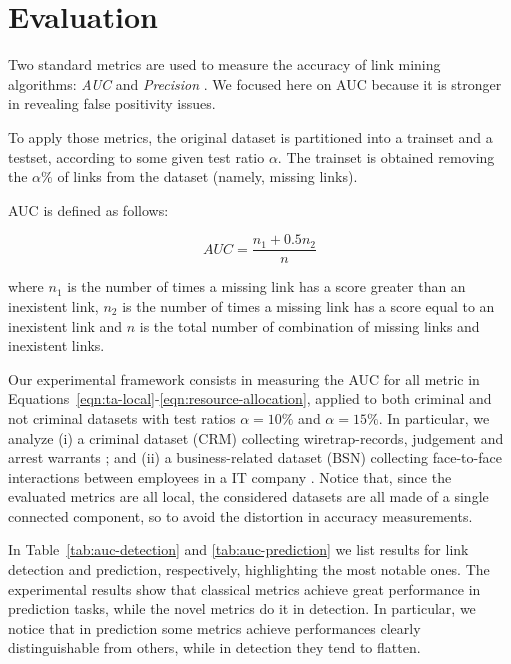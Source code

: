 \section{Evaluation}
\label{sec:evaluation}

Two standard metrics are used to measure the accuracy of link mining algorithms: \textit{AUC} and  \textit{Precision} \cite{Lu2011}. We focused here on AUC because it is stronger in revealing false positivity issues.

To apply those metrics, the original dataset is partitioned into a trainset and a testset, according to some given test ratio $\alpha$. The trainset is obtained removing the $\alpha\%$ of links from the dataset (namely, missing links).

AUC is defined as follows:

\begin{equation}
\label{eqn:auc}
AUC=\frac{n_{1}+0.5n_{2}}{n}
\end{equation}

where 
$n_{1}$ is the number of times a missing link has a score greater than an inexistent link,
$n_{2}$ is the number of times a missing link has a score equal to an inexistent link and
$n$ is the total number of combination of missing links and inexistent links.

Our experimental framework consists in measuring the AUC for all metric in Equations~\ref{eqn:ta-local}-\ref{eqn:resource-allocation}, applied to both criminal and not criminal datasets with test ratios $\alpha=10\%$ and $\alpha=15\%$.
In particular, we analyze 
(i) a criminal dataset (CRM) collecting wiretrap-records, judgement and arrest warrants \cite{berlusconi2016link}; and
(ii) a business-related dataset (BSN) collecting face-to-face interactions between employees in a IT company \cite{olguin2009sensible}.
Notice that, since the evaluated metrics are all local, the considered datasets are all made of a single connected component, so to avoid the distortion in accuracy measurements.

In Table~\ref{tab:auc-detection} and \ref{tab:auc-prediction} we list results for link detection and prediction, respectively, highlighting the most notable ones.
The experimental results show that classical metrics achieve great performance in prediction tasks, while the novel metrics do it in detection.
In particular, we notice that in prediction some metrics achieve performances clearly distinguishable from others, while in detection they tend to flatten.


